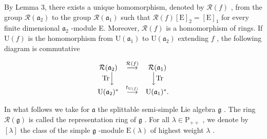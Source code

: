 By Lemma 3, there exists a unique homomorphism, denoted by \(\mathcal{R}(f)\) , from the group \(\mathcal{R}(\mathfrak{a}_2)\) to the group \(\mathcal{R}(\mathfrak{a}_1)\) such that \(\mathcal{R}(f)[\mathrm{E}]_2 = [\mathrm{E}]_1\) for every finite dimensional \(\mathfrak{a}_2\) -module E. Moreover, \(\mathcal{R}(f)\) is a homomorphism of rings. If \(\mathrm{U}(f)\) is the homomorphism from \(\mathrm{U}(\mathfrak{a}_1)\) to \(\mathrm{U}(\mathfrak{a}_2)\) extending \(f\) , the following diagram is commutative

\[
\begin{array}{c c c} \mathcal {R} (\mathfrak {a} _ {2}) & \stackrel {{\mathcal {R} (f)}} {{\longrightarrow}} & \mathcal {R} (\mathfrak {a} _ {1}) \\ \mathrm{Tr} \Big \downarrow & & \Big \downarrow \mathrm{Tr} \\ \mathrm{U} (\mathfrak {a} _ {2}) ^ {*} & \stackrel {{t _ {\mathrm{U} (f)}}} {{\longrightarrow}} & \mathrm{U} (\mathfrak {a} _ {1}) ^ {*}. \end{array}
\]

In what follows we take for \(\mathfrak{a}\) the splittable semi-simple Lie algebra \(\mathfrak{g}\) . The ring \(\mathcal{R}(\mathfrak{g})\) is called the representation ring of \(\mathfrak{g}\) . For all \(\lambda \in \mathrm{P}_{++}\) , we denote by \([\lambda]\) the class of the simple \(\mathfrak{g}\) -module \(\mathrm{E}(\lambda)\) of highest weight \(\lambda\) .

